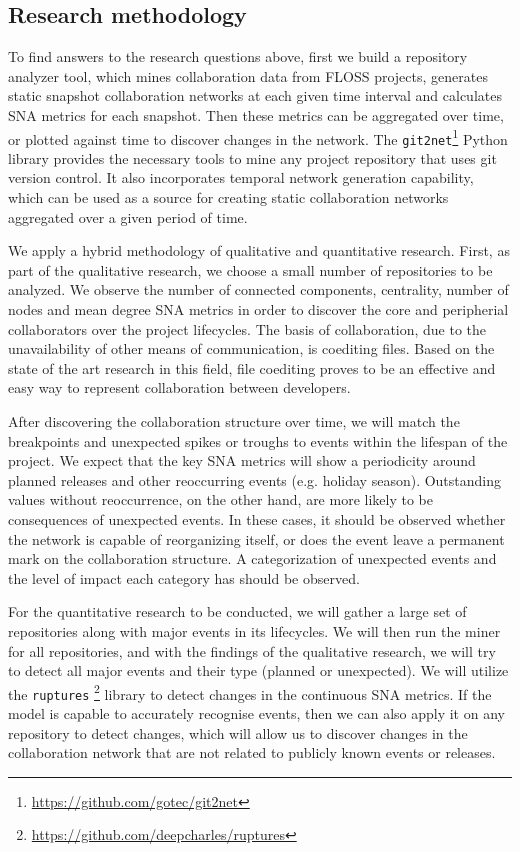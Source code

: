 \subsection{Research methodology}
To find answers to the research questions above, first we build a repository analyzer tool, which mines collaboration data from FLOSS projects, generates static snapshot collaboration networks at each given time interval and calculates SNA metrics for each snapshot. Then these metrics can be aggregated over time, or plotted against time to discover changes in the network. The \texttt{git2net}\footnote{\url{https://github.com/gotec/git2net}} \cite{goteAnalysingTimeStampedCoEditing2019} Python library provides the necessary tools to mine any project repository that uses git version control. It also incorporates temporal network generation capability, which can be used as a source for creating static collaboration networks aggregated over a given period of time.


We apply a hybrid methodology of qualitative and quantitative research. First, as part of the qualitative research, we choose a small number of repositories to be analyzed. We observe the number of connected components, centrality, number of nodes and mean degree SNA metrics in order to discover the core and peripherial collaborators over the project lifecycles. The basis of collaboration, due to the unavailability of other means of communication, is coediting files. Based on the state of the art research in this field, file coediting proves to be an effective and easy way to represent collaboration between developers.

After discovering the collaboration structure over time, we will match the breakpoints and unexpected spikes or troughs to events within the lifespan of the project. We expect that the key SNA metrics will show a periodicity around planned releases and other reoccurring events (e.g. holiday season). Outstanding values without reoccurrence, on the other hand, are more likely to be consequences of unexpected events. In these cases, it should be observed whether the network is capable of reorganizing itself, or does the event leave a permanent mark on the collaboration structure. A categorization of unexpected events and the level of impact each category has should be observed.

For the quantitative research to be conducted, we will gather a large set of repositories along with major events in its lifecycles. We will then run the miner for all repositories, and with the findings of the qualitative research, we will try to detect all major events and their type (planned or unexpected). We will utilize the \texttt{ruptures} \footnote{\url{https://github.com/deepcharles/ruptures}} library to detect changes in the continuous SNA metrics. If the model is capable to accurately recognise events, then we can also apply it on any repository to detect changes, which will allow us to discover changes in the collaboration network that are not related to publicly known events or releases.

